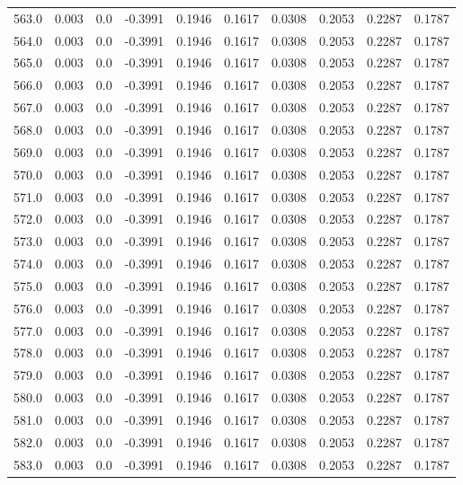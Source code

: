\begin{longtable}{lrrrrrrrrr}
563.0 & 0.003 & 0.0 & -0.3991 & 0.1946 & 0.1617 & 0.0308 & 0.2053 & 0.2287 & 0.1787 \\
564.0 & 0.003 & 0.0 & -0.3991 & 0.1946 & 0.1617 & 0.0308 & 0.2053 & 0.2287 & 0.1787 \\
565.0 & 0.003 & 0.0 & -0.3991 & 0.1946 & 0.1617 & 0.0308 & 0.2053 & 0.2287 & 0.1787 \\
566.0 & 0.003 & 0.0 & -0.3991 & 0.1946 & 0.1617 & 0.0308 & 0.2053 & 0.2287 & 0.1787 \\
567.0 & 0.003 & 0.0 & -0.3991 & 0.1946 & 0.1617 & 0.0308 & 0.2053 & 0.2287 & 0.1787 \\
568.0 & 0.003 & 0.0 & -0.3991 & 0.1946 & 0.1617 & 0.0308 & 0.2053 & 0.2287 & 0.1787 \\
569.0 & 0.003 & 0.0 & -0.3991 & 0.1946 & 0.1617 & 0.0308 & 0.2053 & 0.2287 & 0.1787 \\
570.0 & 0.003 & 0.0 & -0.3991 & 0.1946 & 0.1617 & 0.0308 & 0.2053 & 0.2287 & 0.1787 \\
571.0 & 0.003 & 0.0 & -0.3991 & 0.1946 & 0.1617 & 0.0308 & 0.2053 & 0.2287 & 0.1787 \\
572.0 & 0.003 & 0.0 & -0.3991 & 0.1946 & 0.1617 & 0.0308 & 0.2053 & 0.2287 & 0.1787 \\
573.0 & 0.003 & 0.0 & -0.3991 & 0.1946 & 0.1617 & 0.0308 & 0.2053 & 0.2287 & 0.1787 \\
574.0 & 0.003 & 0.0 & -0.3991 & 0.1946 & 0.1617 & 0.0308 & 0.2053 & 0.2287 & 0.1787 \\
575.0 & 0.003 & 0.0 & -0.3991 & 0.1946 & 0.1617 & 0.0308 & 0.2053 & 0.2287 & 0.1787 \\
576.0 & 0.003 & 0.0 & -0.3991 & 0.1946 & 0.1617 & 0.0308 & 0.2053 & 0.2287 & 0.1787 \\
577.0 & 0.003 & 0.0 & -0.3991 & 0.1946 & 0.1617 & 0.0308 & 0.2053 & 0.2287 & 0.1787 \\
578.0 & 0.003 & 0.0 & -0.3991 & 0.1946 & 0.1617 & 0.0308 & 0.2053 & 0.2287 & 0.1787 \\
579.0 & 0.003 & 0.0 & -0.3991 & 0.1946 & 0.1617 & 0.0308 & 0.2053 & 0.2287 & 0.1787 \\
580.0 & 0.003 & 0.0 & -0.3991 & 0.1946 & 0.1617 & 0.0308 & 0.2053 & 0.2287 & 0.1787 \\
581.0 & 0.003 & 0.0 & -0.3991 & 0.1946 & 0.1617 & 0.0308 & 0.2053 & 0.2287 & 0.1787 \\
582.0 & 0.003 & 0.0 & -0.3991 & 0.1946 & 0.1617 & 0.0308 & 0.2053 & 0.2287 & 0.1787 \\
583.0 & 0.003 & 0.0 & -0.3991 & 0.1946 & 0.1617 & 0.0308 & 0.2053 & 0.2287 & 0.1787 \\

\end{longtable}
